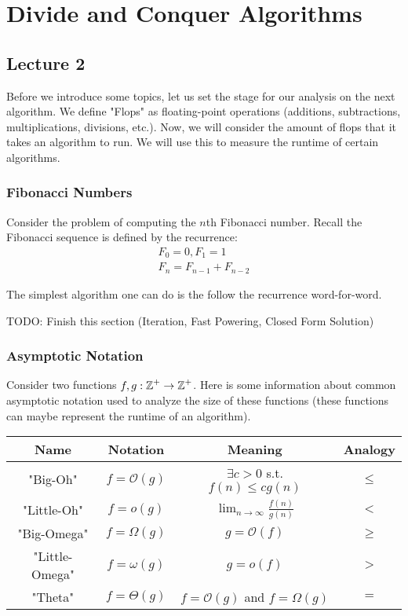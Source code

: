 \section{Divide and Conquer Algorithms}

\subsection{Lecture 2}

Before we introduce some topics, let us set the stage for our analysis on the next algorithm.
We define "Flops" as floating-point operations (additions, subtractions, multiplications, divisions, etc.). Now,
we will consider the amount of flops that it takes an algorithm to run. We will use this to measure the runtime of
certain algorithms.

\subsubsection{Fibonacci Numbers}
Consider the problem of computing the $n$th Fibonacci number. Recall
the Fibonacci sequence is defined by the recurrence:
\begin{align*}
    F_0 = 0, F_1 = 1 \\
    F_n = F_{n - 1} + F_{n - 2}
\end{align*}

The simplest algorithm one can do is the follow the recurrence word-for-word.

TODO: Finish this section (Iteration, Fast Powering, Closed Form Solution)

\subsubsection{Asymptotic Notation}
Consider two functions $f, g: \operatorname{\mathbb{Z}}^+ \to \operatorname{\mathbb{Z}}^+$. Here is some information about common asymptotic notation used to analyze
the size of these functions (these functions can maybe represent the runtime of an algorithm). 

\begin{center}
\begin{tabular}{ c|c|c|c }
    Name & Notation & Meaning & Analogy \\ \hline
    "Big-Oh" & $f = \mathcal{O}(g)$ & $\exists c > 0$ s.t. $f(n) \leq cg(n)$ & $\leq$\\ \hline
    "Little-Oh" & $f = o(g)$ & $\lim_{n \to \infty} \frac{f(n)}{g(n)}$ & $<$ \\ \hline
    "Big-Omega" & $f = \Omega(g)$ & $g = \mathcal{O}(f)$ & $\geq$ \\ \hline
    "Little-Omega" & $f = \omega(g)$ & $g = o(f)$ & $>$ \\ \hline
    "Theta" & $f = \Theta(g)$ & $f = \mathcal{O}(g)$ and $f = \Omega(g)$ & $=$ \\ \hline
\end{tabular}
\end{center}


